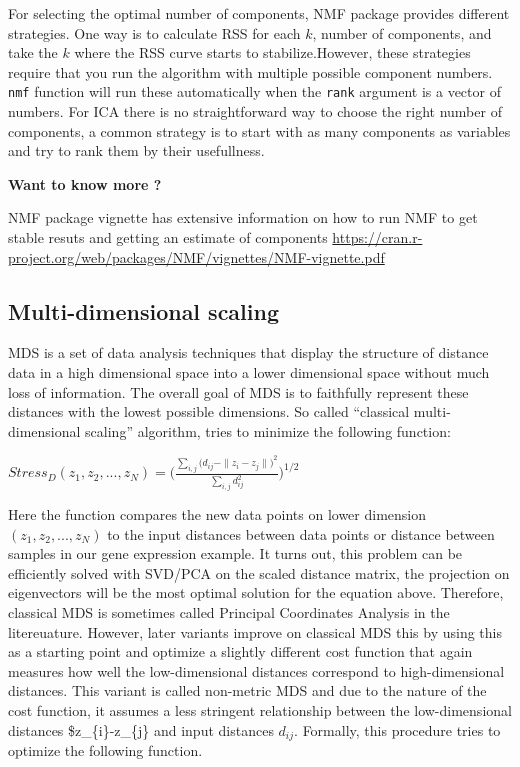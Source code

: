 \documentclass[12pt,]{krantz}
\let\BeginKnitrBlock\begin \let\EndKnitrBlock\end
\begin{document}
For selecting the optimal number of components, NMF package provides different strategies. One way is to calculate RSS for each \(k\), number of components, and take the \(k\) where the RSS curve starts to stabilize.However, these strategies require that you run the algorithm with multiple possible component numbers. \texttt{nmf} function will run these automatically when the \texttt{rank} argument is a vector of numbers. For ICA there is no straightforward way to choose the right number of components, a common strategy is to start with as many components as variables and try to rank them by their usefullness.

\BeginKnitrBlock{rmdtip}
\textbf{Want to know more ?}

NMF package vignette has extensive information on how to run NMF to get stable resuts and getting an estimate of components \url{https://cran.r-project.org/web/packages/NMF/vignettes/NMF-vignette.pdf}
\EndKnitrBlock{rmdtip}

\hypertarget{multi-dimensional-scaling}{%
\subsection{Multi-dimensional scaling}\label{multi-dimensional-scaling}}

MDS is a set of data analysis techniques that display the structure of distance data in a high dimensional space into a lower dimensional space without much loss of information. The overall goal of MDS is to faithfully represent these distances with the lowest possible dimensions. So called ``classical multi-dimensional scaling'' algorithm, tries to minimize the following function:

\({\displaystyle Stress_{D}(z_{1},z_{2},...,z_{N})={\Biggl (}{\frac {\sum _{i,j}{\bigl (}d_{ij}-\|z_{i}-z_{j}\|{\bigr )}^{2}}{\sum _{i,j}d_{ij}^{2}}}{\Biggr )}^{1/2}}\)

Here the function compares the new data points on lower dimension \((z_{1},z_{2},...,z_{N})\) to the input distances between data points or distance between samples in our gene expression example. It turns out, this problem can be efficiently solved with SVD/PCA on the scaled distance matrix, the projection on eigenvectors will be the most optimal solution for the equation above. Therefore, classical MDS is sometimes called Principal Coordinates Analysis in the litereuature. However, later variants improve on classical MDS this by using this as a starting point and optimize a slightly different cost function that again measures how well the low-dimensional distances correspond to high-dimensional distances. This variant is called non-metric MDS and due to the nature of the cost function, it assumes a less stringent relationship between the low-dimensional distances \$\textbar{}z\_\{i\}-z\_\{j\}\textbar{} and input distances \(d_{ij}\). Formally, this procedure tries to optimize the following function.
\end{document}
